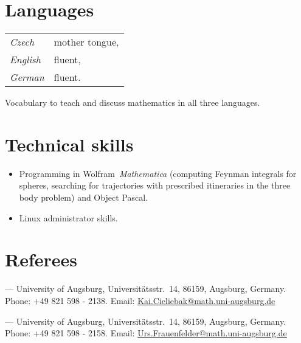 \documentclass[a4paper,12pt]{article}
\begin{document}
\section*{Languages}

\begingroup
\def\arraystretch{1}
\setlength\LTpost{1ex}
\begin{tabularx}{\textwidth}{@{}lX@{}}
\emph{Czech}& mother tongue,\\
\emph{English} & fluent, \\
\emph{German} & fluent.
\end{tabularx}
Vocabulary to teach and discuss mathematics in all three languages.
\endgroup

\section*{Technical skills}

\begin{itemize}[leftmargin=*]
\item Programming in Wolfram~\textit{Mathematica}\textsuperscript{\textregistered} (computing Feynman integrals for spheres, searching for trajectories with prescribed itineraries in the three body problem) and Object Pascal.
\item Linux administrator skills.
\end{itemize}

%

\section*{Referees}

\begin{description}[font=\normalfont]
\item[Prof.~Dr.~Kai Cieliebak] --- University of Augsburg, Universitätsstr.~14, 86159, Augsburg, Germany. Phone: 	+49 821 598 - 2138. Email: \href{mailto:Kai.Cieliebak@math.uni-augsburg.de}{Kai.Cieliebak@math.uni-augsburg.de}
\item[Prof.~Dr.~Urs Frauenfelder] --- University of Augsburg, Universitätsstr.~14, 86159, Augsburg, Germany. Phone: +49 821 598 - 2158.  Email: \href{mailto:Urs.Frauenfelder@math.uni-augsburg.de}{Urs.Frauenfelder@math.uni-augsburg.de}
\end{description}
\end{document}
